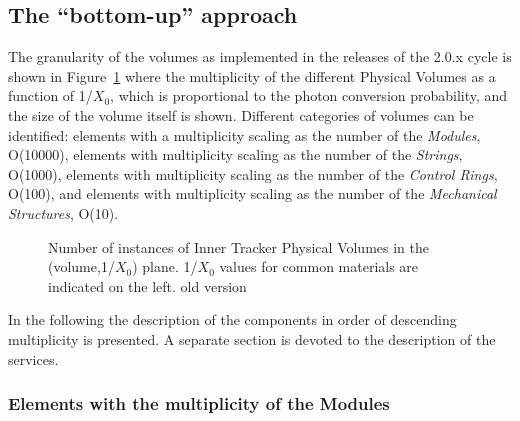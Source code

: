 \documentclass{cmspaper}
\begin{document}
\subsection{The ``bottom-up'' approach}
The granularity of the volumes as implemented in the releases of the
2.0.x cycle is shown in Figure~\ref{fig:tibtid_pv_size} where the multiplicity of the
different Physical Volumes as a function of 1/$X_0$, which is
proportional to the photon conversion probability, and the size of
the volume itself is shown. Different categories of volumes can be
identified: elements with a multiplicity scaling as the number of the
{\it Modules}, O(10000),  elements with multiplicity scaling as the number
of the {\it Strings}, O(1000), elements with multiplicity scaling as the
number of the {\it Control Rings}, O(100), and elements with multiplicity
scaling as the number of the {\it Mechanical Structures}, O(10). 
\begin{figure}[hbtp]
  \begin{center}
    \caption{Number of instances of Inner Tracker Physical Volumes in
      the (volume,1/$X_0$) plane. 1/$X_0$ values for common materials are indicated on the
    left. \fixme old version}
    \label{fig:tibtid_pv_size}
  \end{center}
\end{figure}
In the following the description of the components in
order of descending multiplicity is presented. A separate section is devoted to the
description of the services.

\subsubsection{Elements with the multiplicity of the Modules}
\end{document}
